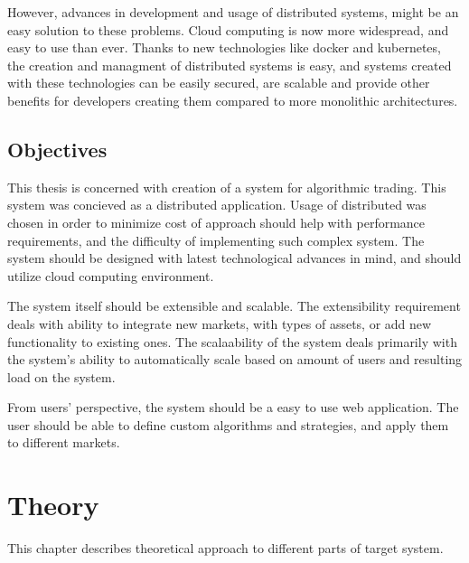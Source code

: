 However, advances in development and usage of distributed systems, might be an easy solution to these problems.
Cloud computing is now more widespread, and easy to use than ever. Thanks to new technologies like
docker and kubernetes, the creation and managment of distributed systems is easy,
and systems created with these technologies can be easily secured, are scalable and provide other benefits
for developers creating them compared to more monolithic architectures.

\section{Objectives}
This thesis is concerned with creation of a system for algorithmic trading. This system was concieved
as a distributed application. Usage of distributed was chosen in order to minimize cost of
approach should help with performance requirements,
and the difficulty of implementing such complex system. The system should be designed with latest technological advances in mind, and
should utilize cloud computing environment.


The system itself should be extensible and scalable. The extensibility requirement deals with ability to integrate new markets,
with types of assets, or add new functionality to existing ones. The scalaability of the system deals primarily with the system's
ability to automatically scale based on amount of users and resulting load on the system.


From users' perspective, the system should be a easy to use web application. The user should be able to define custom
algorithms and strategies, and apply them to different markets.


\todo{}

\chapter{Theory}
\label{theory}
This chapter describes theoretical approach to different parts of target system.
